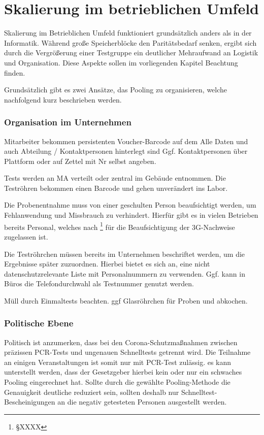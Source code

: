 \section{Skalierung im betrieblichen Umfeld}
Skalierung im Betrieblichen Umfeld funktioniert grundsätzlich anders als in der Informatik.
Während große Speicherblöcke den Paritätsbedarf senken, ergibt sich durch die Vergrößerung einer Testgruppe ein deutlicher Mehraufwand an Logistik und Organisation. 
Diese Aspekte sollen im vorliegenden Kapitel Beachtung finden.

Grundsätzlich gibt es zwei Ansätze, das Pooling zu organisieren, welche nachfolgend kurz beschrieben werden.


\subsubsection{Organisation im Unternehmen}
Mitarbeiter bekommen persistenten Voucher-Barcode auf dem Alle Daten und auch Abteilung / Kontaktpersonen hinterlegt sind
Ggf. Kontaktpersonen über Plattform oder auf Zettel mit Nr selbst angeben.

Tests werden an MA verteilt oder zentral im Gebäude entnommen.
Die Teströhren bekommen einen Barcode und gehen unverändert ins Labor.

Die Probenentnahme muss von einer geschulten Person beaufsichtigt werden, um Fehlanwendung und Missbrauch zu verhindert.
Hierfür gibt es in vielen Betrieben bereits Personal, welches nach \footnote{§XXXX}
für die Beaufsichtigung der 3G-Nachweise zugelassen ist.

Die Teströhrchen müssen bereits im Unternehmen beschriftet werden, um die Ergebnisse später zuzuordnen.
Hierbei bietet es sich an, eine nicht datenschutzrelevante Liste mit Personalnummern zu verwenden.
Ggf. kann in Büros die Telefondurchwahl als Testnummer genutzt werden.


Müll durch Einmaltests beachten. ggf Glasröhrchen für Proben und abkochen.

\subsubsection{Politische Ebene}
Politisch ist anzumerken, dass bei den Corona-Schutzmaßnahmen zwischen präzissen PCR-Tests und ungenauen Schnelltests getrennt wird.
Die Teilnahme an einigen Veranstaltungen ist somit nur mit PCR-Test zulässig.
es kann unterstellt werden, dass der Gesetzgeber hierbei kein oder nur ein schwaches Pooling eingerechnet hat.
Sollte durch die gewählte Pooling-Methode die Genauigkeit deutliche reduziert sein, sollten deshalb nur Schnelltest-Bescheinigungen an die negativ getesteten Personen ausgestellt werden.
\cleardoublepage




